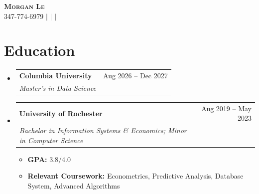 \documentclass[a4paper,11pt]{article}
\makeatletter
\newcommand{\resumeItem}[1]{
  \item\small{
    {#1\par\vspace{-2pt}}
  }
}
\newcommand{\resumeSubheading}[4]{
  \vspace{-2pt}\item
    \begin{tabular*}{0.97\textwidth}[t]{l@{\extracolsep{\fill}}r}
      \textbf{#1} & #2 \\
      \textit{\small#3} & \textit{\small #4} \\
    \end{tabular*}\vspace{-7pt}
}
\newcommand{\resumeSubHeadingListStart}{\begin{itemize}[leftmargin=0.15in, label={}]}
\newcommand{\resumeSubHeadingListEnd}{\end{itemize}}
\newcommand{\resumeItemListStart}{\begin{itemize}}
\newcommand{\resumeItemListEnd}{\end{itemize}\vspace{-5pt}}
\makeatother
\begin{document}
\begin{center}
    \textbf{\Huge \scshape Morgan Le} \\ \vspace{1pt}
    \small 347-774-6979 $|$
    \href{mailto:ml5536@columbia.edu}{\underline{}} $|$
    \href{https://www.linkedin.com/in/morganhle/}{\underline{}} $|$
    \href{https://lhnminh.github.io/}{\underline{}}
\end{center}

\section{Education}
\resumeSubHeadingListStart
  \resumeSubheading
    {Columbia University}{Aug 2026 -- Dec 2027}
    {Master's in Data Science}{}
  \resumeSubheading
    {University of Rochester}{Aug 2019 -- May 2023}
    {Bachelor in Information Systems \& Economics; Minor in Computer Science}{}
    \resumeItemListStart
      \resumeItem{\textbf{GPA:} 3.8/4.0}
      \resumeItem{\textbf{Relevant Coursework:} Econometrics, Predictive Analysis, Database System, Advanced Algorithms}
    \resumeItemListEnd
\resumeSubHeadingListEnd
\end{document}
